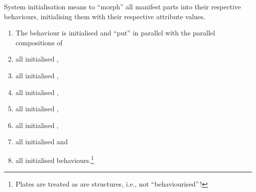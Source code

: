 \label{pipe:System Initialisation}

\begynd
\pind System initialisation means to ``morph'' all manifest parts
\begynd
\pind into their respective behaviours,
\pind initialising them with their respective attribute values.
\afslut
\afslut

\begin{multicols}{2}
\begin{enumerate}\setei
\item \label{pls-init-1000}  The  behaviour is
                             initialised and ``put'' in parallel with
                             the parallel compositions of 
\item \label{pls-init-1100}  all initialised ,
\item \label{pls-init-1200}  all initialised ,
\item \label{pls-init-1300}  all initialised ,
\item \label{pls-init-1400}  all initialised ,
\item \label{pls-init-1500}  all initialised ,
\item \label{pls-init-1600}  all initialised  and
\item \label{pls-init-1700}  all initialised 
                             behaviours.\footnote{Plates are treated
                             as are structures, i.e., not ``behaviourised''\,!}
\savei\end{enumerate}
\end{multicols}\footnotesize\mnewfoil\LLLL
